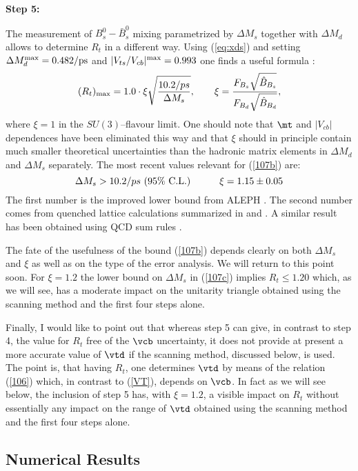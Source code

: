{\bf Step 5:}

{}The measurement of $B^0_s-\bar B^0_s$ mixing parametrized by $\Delta M_s$
together with $\Delta M_d$  allows to determine $R_t$ in a different
way. Using (\ref{eq:xds}) and setting $\Delta M^{{\rm max}}_d= 0.482/
\mbox{ps}$ and 
$|V_{ts}/V_{cb}|^{{\rm max}}=0.993$  one finds a useful formula
\cite{ABWAR}:
\begin{equation}\label{107b}
(R_t)_{\rm max} = 1.0 \cdot \xi \sqrt{\frac{10.2/ps}{\Delta M_s}},
\qquad
\xi = 
\frac{F_{B_s} \sqrt{\hat B_{B_s}}}{F_{B_d} \sqrt{\hat B_{B_d}}},
\end{equation}
where $\xi=1$ in the  $SU(3)$--flavour limit.
One should 
note that $\mt$ and $|V_{cb}|$ dependences have been eliminated this way
 and that $\xi$ should in principle 
contain much smaller theoretical
uncertainties than the hadronic matrix elements in $\Delta M_d$ and 
$\Delta M_s$ separately.  
The most recent values relevant for (\ref{107b}) are:
\begin{equation}\label{107c}
\Delta M_s > 10.2/ ps ~(95\%~{\rm  C.L.})
\qquad\quad
\xi=1.15\pm 0.05
\end{equation}
The first number is the improved lower bound from ALEPH \cite{Drell}.
The second number comes from quenched lattice calculations summarized
in \cite{Flynn} and \cite{Bernard}.
A similar result has been obtained using QCD sum rules \cite{NAR}.

The fate of the usefulness of the bound (\ref{107b}) depends clearly
on both $\Delta M_s$ and $\xi$ as well as on the type of the error
analysis. We will return to this point soon.
For $\xi=1.2$ 
the lower bound on $\Delta M_s$ in (\ref{107c}) implies $R_t\le 1.20$
which, as we will see, has a moderate impact on the unitarity triangle
obtained using the scanning method and 
the first four steps alone. 

Finally, I would like to point out that whereas step 5 can give, 
in contrast
to step 4, the value for $R_t$ free of the $\vcb$ uncertainty, it does
not provide at present a more accurate value of $\vtd$ if the scanning
method, discussed below, is used. The point is, that 
having $R_t$, one determines $\vtd$ by means of the relation (\ref{106})
which, in contrast to (\ref{VT}), depends on $\vcb$. 
In fact as we will see below, the inclusion
of step 5 has, with $\xi=1.2$, a visible impact on $R_t$ without
essentially any impact on the range of $\vtd$ obtained using the scanning
method and the first four steps alone.
\subsection{Numerical Results}\label{sec:standard}
